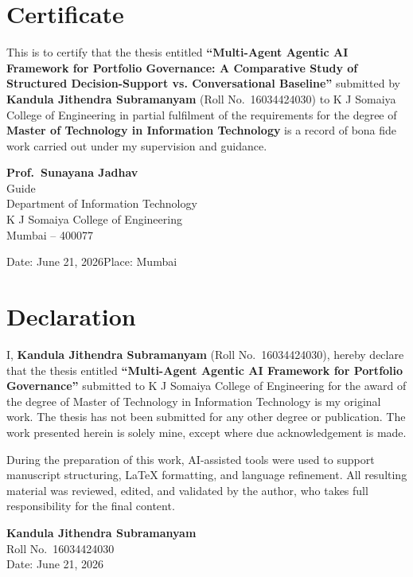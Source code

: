 \documentclass[11pt]{article}
\newcommand{\thesistitle}{Multi-Agent Agentic AI Framework for Portfolio Governance}
\newcommand{\thesissubtitle}{A Comparative Study of Structured Decision-Support vs. Conversational Baseline}
\newcommand{\thesisauthor}{Kandula Jithendra Subramanyam}
\newcommand{\thesisrollno}{16034424030}
\newcommand{\thesisguide}{Prof.\ Sunayana Jadhav}
\begin{document}
\clearpage
\section*{Certificate}
This is to certify that the thesis entitled \textbf{``\thesistitle: \thesissubtitle''} submitted by \textbf{\thesisauthor} (Roll No.\ \thesisrollno) to K J Somaiya College of Engineering in partial fulfilment of the requirements for the degree of \textbf{Master of Technology in Information Technology} is a record of bona fide work carried out under my supervision and guidance.

\vspace{2cm}
\begin{flushright}
\textbf{\thesisguide}\\
Guide\\
Department of Information Technology\\
K J Somaiya College of Engineering\\
Mumbai -- 400077
\end{flushright}

\vspace{1cm}
\noindent Date: June 21, 2026\hfill Place: Mumbai

\clearpage
\section*{Declaration}
I, \textbf{\thesisauthor} (Roll No.\ \thesisrollno), hereby declare that the thesis entitled \textbf{``\thesistitle''} submitted to K J Somaiya College of Engineering for the award of the degree of Master of Technology in Information Technology is my original work. The thesis has not been submitted for any other degree or publication. The work presented herein is solely mine, except where due acknowledgement is made.

During the preparation of this work, AI-assisted tools were used to support manuscript structuring, \LaTeX{} formatting, and language refinement. All resulting material was reviewed, edited, and validated by the author, who takes full responsibility for the final content.

\vspace{2cm}
\begin{flushright}
\textbf{\thesisauthor}\\
Roll No.\ \thesisrollno\\
Date: June 21, 2026
\end{flushright}
\end{document}
